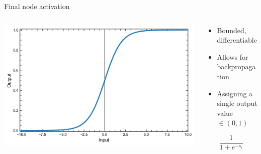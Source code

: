 \begin{frame}{Final node activation}
    \begin{columns}
        \begin{column}{0.65\textwidth}
            \includegraphics[width=\textwidth]{sigmoid}
        \end{column}
        \begin{column}{0.5\textwidth}
            \begin{itemize}
                \item Bounded, differentiable
                \item Allows for backpropagation
                \item Assigning a single output value $\in (0,1)$
            \end{itemize}
            \begingroup
            \large
            \begin{equation*}
                \frac{1}{1+e^{-s_i}}
            \end{equation*}
            \endgroup
        \end{column}
    \end{columns}
\end{frame}

